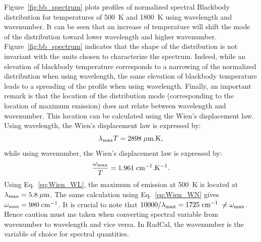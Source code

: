 Figure~\ref{fig:bb_spectrum} plots profiles of normalized spectral Blackbody distribution for temperatures of 500~K and 1800~K using wavelength and wavenumber. It can be seen that an increase of temperature will shift the mode of the distribution toward lower wavelength and higher wavenumber. Figure~\ref{fig:bb_spectrum} indicates that the shape of the distribution is not invariant with the units chosen to characterize the spectrum. Indeed, while an elevation of blackbody temperature corresponds to a narrowing of the normalized distribution when using wavelength, the same elevation of blackbody temperature leads to a spreading of the profile when using wavelength. Finally, an important remark is that the location of the distribution mode (corresponding to the location of maximum emission) does not relate between wavelength and wavenumber. This location can be calculated using the Wien's displacement law. Using wavelength, the Wien's displacement law is expressed by:
\begin{equation}\label{eq:Wien_WL}
\lambda_{\rm max} T = 2898 \; \mu \rm m . \rm K,
\end{equation}
while using wavenumber, the Wien's displacement law is expressed by:
\begin{equation}\label{eq:Wien_WN}
 \dfrac{\omega_{\rm max}}{T} = 1.961 \; \rm cm^{-1}.K^{-1}.
\end{equation}
Using Eq.~\ref{eq:Wien_WL}, the maximum of emission at 500~K is located at $\lambda_{\rm max} = \rm 5.8 \; \mu m$. The same calculation using Eq.~\ref{eq:Wien_WN} gives $\omega_{\rm max} =  980 \; \rm cm^{-1}$. It is crucial to note that $10000/\lambda_{\rm max} = 1725 \; \rm cm^{-1} \; \neq \omega_{\rm max}$. Hence caution must me taken when converting spectral variable from wavenumber to wavelength and vice versa. In RadCal, the wavenumber is the variable of choice for spectral quantities.


